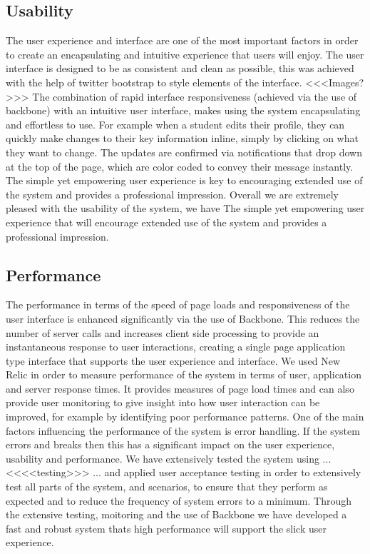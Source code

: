 \subsection{Usability}
	The user experience and interface are one of the most important factors in order to create an encapsulating and intuitive experience that users will enjoy. The user interface is designed to be as consistent and clean as possible, this was achieved with the help of twitter bootstrap to style elements of the interface.
		<<<Images?>>>
	The combination of rapid interface responsiveness (achieved via the use of backbone) with an intuitive user interface, makes using the system encapsulating and effortless to use. For example when a student edits their profile, they can quickly make changes to their key information inline, simply by clicking on what they want to change. The updates are confirmed via notifications that drop down at the top of the page, which are color coded to convey their message instantly. The simple yet empowering user experience is key to encouraging extended use of the system and provides a professional impression. Overall we are extremely pleased with the usability of the system, we have The simple yet empowering user experience that will encourage extended use of the system and provides a professional impression. 
\subsection{Performance}
	The performance in terms of the speed of page loads and responsiveness of the user interface is enhanced significantly via the use of Backbone. This reduces the number of server calls and increases client side processing to provide an instantaneous response to user interactions, creating a single page application type interface that supports the user experience and interface. We used New Relic in order to measure performance of the system in terms of user, application and server response times. It provides measures of page load times and can also provide user monitoring to give insight into how user interaction can be improved, for example by identifying poor performance patterns.
	One of the main factors influencing the performance of the system is error handling. If the system errors and breaks then this has a significant impact on the user experience, usability and performance. We have extensively tested the system using ... <<<<testing>>> ... and applied user acceptance testing in order to extensively test all parts of the system, and scenarios, to ensure that they perform as expected and to reduce the frequency of system errors to a minimum.
	Through the extensive testing, moitoring and the use of Backbone we have developed a fast and robust system thats high performance will support the slick user experience.
